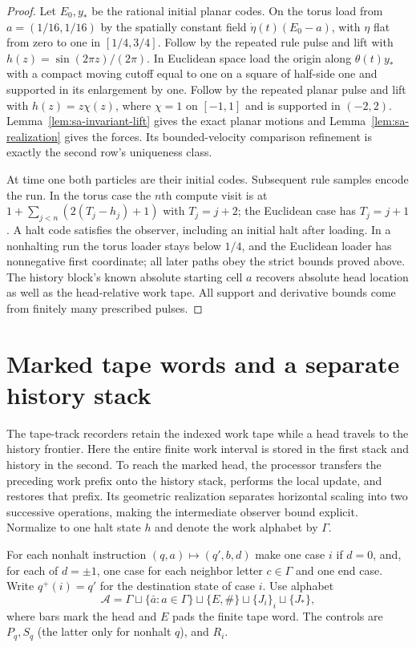 \begin{proof}
Let $E_0,y_*$ be the rational initial planar codes.  On the torus load
from $a=(1/16,1/16)$ by the spatially constant field
$\dot\eta(t)(E_0-a)$, with $\eta$ flat from zero to one in
$[1/4,3/4]$.  Follow by the repeated rule pulse and lift with
$h(z)=\sin(2\pi z)/(2\pi)$.  In Euclidean space load the origin along
$\theta(t)y_*$ with a compact moving cutoff equal to one on a square
of half-side one and supported in its enlargement by one.  Follow by
the repeated planar pulse and lift with $h(z)=z\chi(z)$, where
$\chi=1$ on $[-1,1]$ and is supported in $(-2,2)$.
Lemma~\ref{lem:sa-invariant-lift} gives the exact planar motions and
Lemma~\ref{lem:sa-realization} gives the forces.  Its bounded-velocity
comparison refinement is exactly the second row's uniqueness class.

At time one both particles are their initial codes.  Subsequent rule
samples encode the run.  In the torus case the $n$th compute visit is
at $1+\sum_{j<n}(2(T_j-h_j)+1)$ with $T_j=j+2$; the Euclidean case
has $T_j=j+1$.  A halt code satisfies the observer, including an initial
halt after loading.  In a nonhalting run the torus loader stays below
$1/4$, and the Euclidean loader has nonnegative first coordinate; all
later paths obey the strict bounds proved above.  The history block's
known absolute starting cell $a$ recovers absolute head location as
well as the head-relative work tape.  All support and derivative bounds
come from finitely many prescribed pulses.
\end{proof}

\section{Marked tape words and a separate history stack}
\label{sec:sa-marked-five-stage}
The tape-track recorders retain the indexed work tape while a head
travels to the history frontier.  Here the entire finite work interval is
stored in the first stack and history in the second.  To reach the marked
head, the processor transfers the preceding work prefix onto the history
stack, performs the local update, and restores that prefix.  Its geometric
realization separates horizontal scaling into two successive operations,
making the intermediate observer bound explicit.
Normalize to one halt state $h$ and denote the work alphabet by $\Gamma$.

For each nonhalt instruction $(q,a)\mapsto(q',b,d)$ make one case $i$
if $d=0$, and, for each of $d=\pm1$, one case for each neighbor letter
$c\in\Gamma$ and one end case.  Write $q^+(i)=q'$ for the
destination state of case $i$.  Use alphabet
\[
 \mathcal A=\Gamma\sqcup\{\bar a:a\in\Gamma\}
       \sqcup\{E,\#\}\sqcup\{J_i\}_i\sqcup\{J_*\},
\]
where bars mark the head and $E$ pads the finite tape word.
The controls are $P_q,S_q$ (the latter only for nonhalt $q$), and $R_i$.

